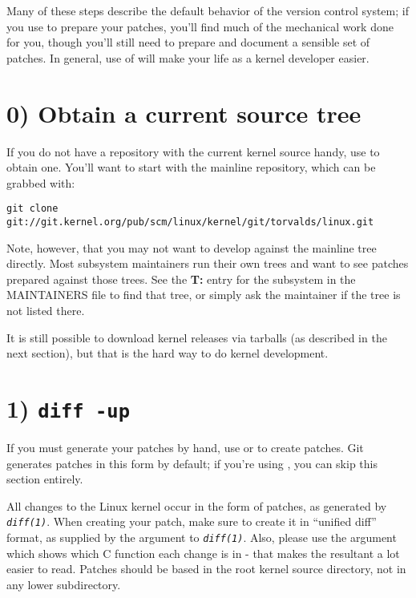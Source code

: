 \documentclass[a4paper,8pt,english]{sphinxmanual}
\begin{document}
Many of these steps describe the default behavior of the  version
control system; if you use  to prepare your patches, you'll find much
of the mechanical work done for you, though you'll still need to prepare
and document a sensible set of patches.  In general, use of  will make
your life as a kernel developer easier.


\section{0) Obtain a current source tree}
\label{process/submitting-patches:obtain-a-current-source-tree}
If you do not have a repository with the current kernel source handy, use
 to obtain one.  You'll want to start with the mainline repository,
which can be grabbed with:

\begin{Verbatim}[commandchars=\\\{\}]
git clone git://git.kernel.org/pub/scm/linux/kernel/git/torvalds/linux.git
\end{Verbatim}

Note, however, that you may not want to develop against the mainline tree
directly.  Most subsystem maintainers run their own trees and want to see
patches prepared against those trees.  See the \textbf{T:} entry for the subsystem
in the MAINTAINERS file to find that tree, or simply ask the maintainer if
the tree is not listed there.

It is still possible to download kernel releases via tarballs (as described
in the next section), but that is the hard way to do kernel development.


\section{1) \texttt{diff -up}}
\label{process/submitting-patches:diff-up}
If you must generate your patches by hand, use  or 
to create patches.  Git generates patches in this form by default; if
you're using , you can skip this section entirely.

All changes to the Linux kernel occur in the form of patches, as
generated by \emph{\texttt{diff(1)}}.  When creating your patch, make sure to
create it in ``unified diff'' format, as supplied by the  argument
to \emph{\texttt{diff(1)}}.
Also, please use the  argument which shows which C function each
change is in - that makes the resultant  a lot easier to read.
Patches should be based in the root kernel source directory,
not in any lower subdirectory.
\end{document}

